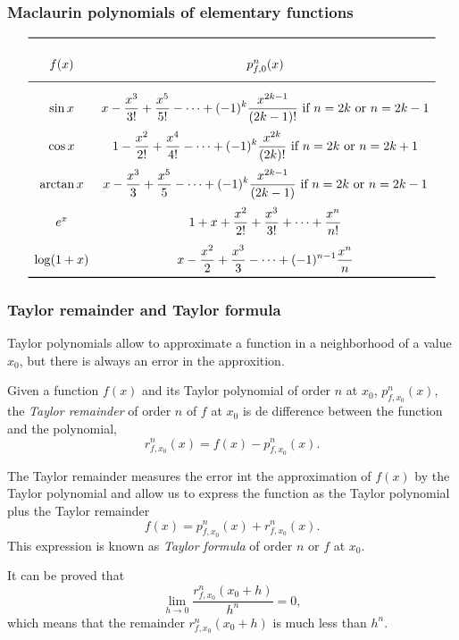 \begin{frame}
\frametitle{Maclaurin polynomials of elementary functions}
\[
\renewcommand{\arraystretch}{2.5}
\begin{array}{cc}
\toprule
f(x) & p_{f,0}^n(x) \\
\midrule
\sin x & \displaystyle x - \frac{x^3}{3!} + \frac{x^5}{5!} - \cdots + (-1)^k\frac{x^{2k-1}}{(2k-1)!} \mbox{ if $n=2k$ or $n=2k-1$}\\
\cos x &  \displaystyle 1 - \frac{x^2}{2!} + \frac{x^4}{4!} - \cdots + (-1)^k\frac{x^{2k}}{(2k)!} \mbox{ if $n=2k$ or $n=2k+1$}\\
\arctan x &  \displaystyle x - \frac{x^3}{3} + \frac{x^5}{5} - \cdots + (-1)^k\frac{x^{2k-1}}{(2k-1)} \mbox{ if $n=2k$ or $n=2k-1$}\\
e^x & \displaystyle 1 + x + \frac{x^2}{2!} + \frac{x^3}{3!} + \cdots + \frac{x^n}{n!}\\
\log(1+x) & \displaystyle x - \frac{x^2}{2} + \frac{x^3}{3} - \cdots + (-1)^{n-1}\frac{x^n}{n}\\
\bottomrule
\end{array}
\]
\end{frame}


\begin{frame}
\frametitle{Taylor remainder and Taylor formula}
Taylor polynomials allow to approximate a function in a neighborhood of a value $x_0$, but there is always an error in the approxition.
\begin{definition}
Given a function  $f(x)$ and its Taylor polynomial of order $n$ at $x_0$, $p_{f,x_0}^n(x)$, the \emph{Taylor remainder} of order $n$ of $f$ at $x_0$ is de difference between the function and the polynomial,
\[
r_{f,x_0}^n(x)=f(x)-p_{f,x_0}^n(x).
\]
\end{definition}

The Taylor remainder measures the error int the approximation of $f(x)$ by the Taylor polynomial and allow us to express the function as the Taylor polynomial plus the Taylor remainder
\[
f(x)=p_{f,x_0}^n(x) + r_{f,x_0}^n(x).
\]
This expression is known as \emph{Taylor formula} of order $n$ or $f$ at $x_0$. 

It can be proved that
\[
\lim_{h\rightarrow 0}\frac{r_{f,x_0}^n(x_0+h)}{h^n}=0,
\]
which means that the remainder $r_{f,x_0}^n(x_0+h)$ is much less than $h^n$.
\end{frame}
